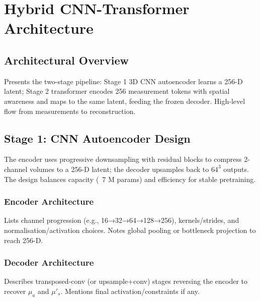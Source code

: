 
\chapter{Hybrid CNN-Transformer Architecture}

\section{Architectural Overview}

Presents the two-stage pipeline: Stage 1 3D CNN autoencoder learns a 256-D latent; Stage 2 transformer encodes 256 measurement tokens with spatial awareness and maps to the same latent, feeding the frozen decoder. High-level flow from measurements to reconstruction.


\section{Stage 1: CNN Autoencoder Design}

The encoder uses progressive downsampling with residual blocks to compress 2-channel volumes to a 256-D latent; the decoder upsamples back to $64^3$ outputs. The design balances capacity (~7 M params) and efficiency for stable pretraining.


\subsection{Encoder Architecture}

Lists channel progression (e.g., 16→32→64→128→256), kernels/strides, and normalisation/activation choices. Notes global pooling or bottleneck projection to reach 256-D.


\subsection{Decoder Architecture}

Describes transposed-conv (or upsample+conv) stages reversing the encoder to recover $\mu_a$ and $\mu'_s$. Mentions final activation/constraints if any.

